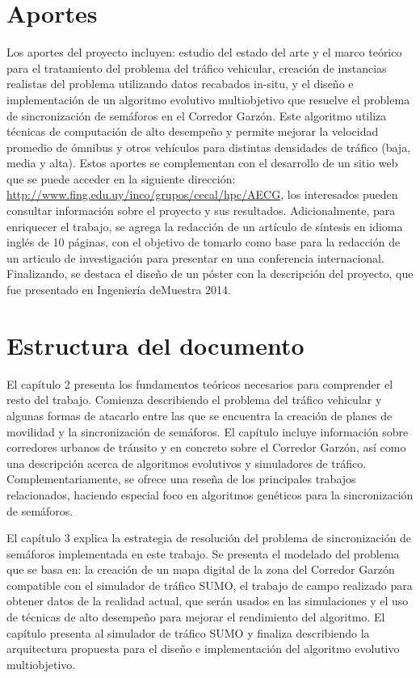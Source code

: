 \section{Aportes}
Los aportes del proyecto incluyen: estudio del estado del arte y el marco teórico para el tratamiento del problema del tráfico vehicular, creación de instancias realistas del problema utilizando datos recabados in-situ, y el diseño e implementación de un algoritmo evolutivo multiobjetivo que resuelve el problema de sincronización de semáforos en el Corredor Garzón. Este algoritmo utiliza técnicas de computación de alto desempeño y permite mejorar la velocidad promedio de ómnibus y otros vehículos para distintas densidades de tráfico (baja, media y alta). Estos aportes se complementan con el desarrollo de un sitio web que se puede acceder en la siguiente dirección: \url{http://www.fing.edu.uy/inco/grupos/cecal/hpc/AECG}, los interesados pueden consultar información sobre el proyecto y sus resultados. Adicionalmente, para enriquecer el trabajo, se agrega la redacción de un artículo de síntesis en idioma inglés de 10 páginas, con el objetivo de tomarlo como base para la redacción de un articulo de investigación para presentar en una conferencia internacional. Finalizando, se destaca el diseño de un póster con la descripción del proyecto, que fue presentado en Ingeniería deMuestra 2014.



\section{Estructura del documento}
El capítulo 2 presenta los fundamentos teóricos necesarios para comprender el resto del trabajo. Comienza describiendo el problema del tráfico vehicular y algunas formas de atacarlo entre las que se encuentra la creación de planes de movilidad y la sincronización de semáforos. El capítulo incluye información sobre corredores urbanos de tránsito y en concreto sobre el Corredor Garzón, así como una descripción acerca de algoritmos evolutivos y simuladores de tráfico. Complementariamente, se ofrece una reseña de los principales trabajos relacionados, haciendo especial foco en algoritmos genéticos para la sincronización de semáforos.

El capítulo 3 explica la estrategia de resolución del problema de sincronización de semáforos implementada en este trabajo. Se presenta el modelado del problema que se basa en: la creación de un mapa digital de la zona del Corredor Garzón compatible con el simulador de tráfico SUMO, el trabajo de campo realizado para obtener datos de la realidad actual, que serán usados en las simulaciones y el uso de técnicas de alto desempeño para mejorar el rendimiento del algoritmo. El capítulo presenta al simulador de tráfico SUMO y finaliza describiendo la arquitectura propuesta para el diseño e implementación del algoritmo evolutivo multiobjetivo.

